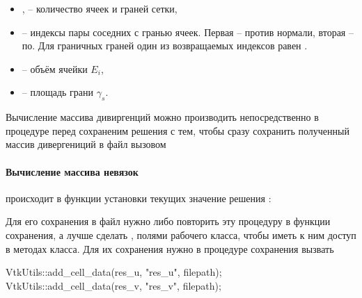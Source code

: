 \begin{itemize}
\item {},  -- количество ячеек и граней сетки,
\item {} -- индексы пары соседних с гранью ячеек. Первая -- против нормали, вторая -- по.
Для граничных граней один из возвращаемых индексов равен .
\item {} -- объём ячейки $E_i$,
\item {} -- площадь грани $\gamma_s$.
\end{itemize}
Вычисление массива дивиргенций можно производить
непосредственно в процедуре перед сохраненим
решения
 с тем, чтобы
сразу сохранить полученный массив дивергениций в файл вызовом


\paragraph{Вычисление массива невязок}
происходит в функции установки текущих значение решения :

Для его сохранения в файл нужно либо повторить эту процедуру в функции сохранения,
а лучше сделать ,  полями рабочего класса,
чтобы иметь к ним доступ в методах класса.
Для их сохранения нужно в процедуре сохранения 
вызвать
\begin{cppcode}
VtkUtils::add_cell_data(res_u, "res_u", filepath);
VtkUtils::add_cell_data(res_v, "res_v", filepath);
\end{cppcode}


